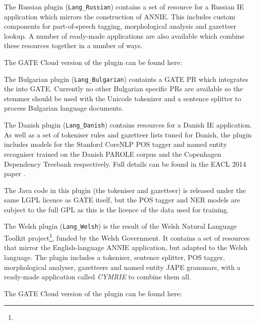 
The Russian plugin (\verb|Lang_Russian|) contains a set of resource for a Russian
IE application which mirrors the construction of ANNIE. This includes custom
components for part-of-speech tagging, morphological analysis and gazetteer
lookup. A number of ready-made applications are also available which combine
these resources together in a number of ways.

The GATE Cloud version of the plugin can be found here: \\

The Bulgarian plugin (\verb|Lang_Bulgarian|) containts a GATE PR which 
integrates the 
into GATE. Currently no other Bulgarian specific PRs are available so
the stemmer should be used with the Unicode tokenizer and a sentence splitter
to process Bulgarian language documents.

The Danish plugin (\verb|Lang_Danish|) contains resources for a Danish IE
application. As well as a set of tokeniser rules and gazetteer lists tuned for
Danish, the plugin includes models for the Stanford CoreNLP POS tagger and
named entity recogniser trained on the Danish PAROLE corpus and the Copenhagen
Dependency Treebank respectively.  Full details can be found in the EACL 2014
paper \cite{Derczynski2014d}.

The Java code in this plugin (the tokeniser and gazetteer) is released under
the same LGPL licence as GATE itself, but the POS tagger and NER models are
subject to the full GPL as this is the licence of the data used for training.

The Welsh plugin (\verb|Lang_Welsh|) is the result of the Welsh Natural
Language Toolkit
project\footnote{},
funded by the Welsh Government.  It contains a set of resources that mirror the
English-language ANNIE application, but adapted to the Welsh language.  The
plugin includes a tokeniser, sentence splitter, POS tagger, morphological
analyser, gazetteers and named entity JAPE grammars, with a ready-made
application called \emph{CYMRIE} to combine them all.

The GATE Cloud version of the plugin can be found here: \\

